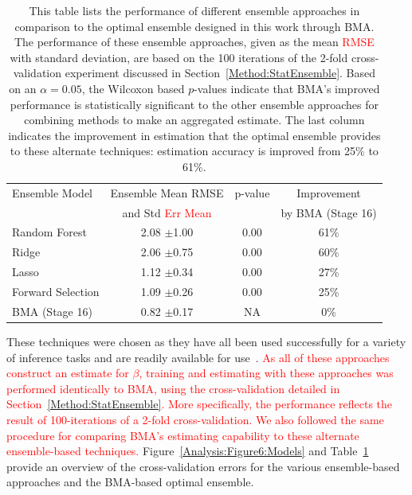 \documentclass[journal=jpcbfk, manuscript=article]{achemso}
\newcommand{\+}[1]{\ensuremath{\mathbf{#1}}}
\newcommand{\rev}[1]{\textsf{\textcolor{red}{#1}}}
\begin{document}
\begin{table}[t!]
	\centering
	\caption[Model comparison with mean RMSE]{This table lists the performance of different ensemble approaches in comparison to the optimal ensemble designed in this work through BMA.
	The performance of these ensemble approaches, given as the mean \rev{RMSE} with standard deviation, are based on the 100 iterations of the 2-fold cross-validation experiment discussed in Section~\ref{Method:StatEnsemble}.
	Based on an $\alpha = 0.05$, the Wilcoxon based $p$-values indicate that BMA's improved performance is statistically significant to the other ensemble approaches for combining methods to make an aggregated estimate.
	The last column indicates the improvement in estimation that the optimal ensemble provides to these alternate techniques: estimation accuracy is improved from 25\% to 61\%. }
	\footnotesize
	\begin{tabular}{lccc}
		\hline
		\hline
		Ensemble Model  & Ensemble Mean RMSE  & p-value & Improvement\\
		 & and Std \rev{Err Mean}& & by BMA (Stage 16)\\
		\hline
		Random Forest & 2.08 $\pm$1.00 & 0.00 & 61\%\\
		Ridge & 2.06 $\pm$0.75 & 0.00 & 60\%\\
		Lasso & 1.12 $\pm$0.34 & 0.00 & 27\%\\
		Forward Selection & 1.09 $\pm$0.26 & 0.00 &  25\%\\		
		BMA (Stage 16) & 0.82 $\pm$0.17 & NA & 0\%\\
		\hline
		\hline
	\end{tabular}
	\label{Analysis:Table4:EnsembleCompare}
\end{table}
These techniques were chosen as they have all been used successfully for a variety of inference tasks and are readily available for use~\cite{R:2008,sklearn_api:2013}.
\rev{As all of these approaches construct an estimate for $\beta$, training and estimating with these approaches was performed identically to BMA, using the cross-validation detailed in Section~\ref{Method:StatEnsemble}.
More specifically, the performance reflects the result of 100-iterations of a 2-fold cross-validation.
We also followed the same procedure for comparing BMA's estimating capability to these alternate ensemble-based techniques.}
Figure~\ref{Analysis:Figure6:Models} and Table~\ref{Analysis:Table4:EnsembleCompare} provide an overview of the cross-validation errors for the various ensemble-based approaches and the BMA-based optimal ensemble.
\end{document}
